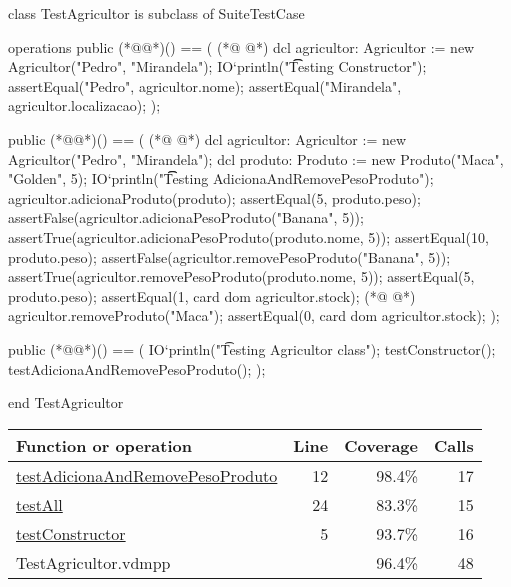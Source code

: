 \begin{vdmpp}[breaklines=true]
class TestAgricultor is subclass of SuiteTestCase
 
operations
  public (*@@*)() == (
(*@
\label{testConstructor:5}
@*)
   dcl agricultor: Agricultor := new Agricultor("Pedro", "Mirandela");
    IO`println("\t\t Testing Constructor");
    assertEqual("Pedro", agricultor.nome);
    assertEqual("Mirandela", agricultor.localizacao);
  );
  
 public (*@@*)() == (
(*@
\label{testAdicionaAndRemovePesoProduto:12}
@*)
  dcl agricultor: Agricultor := new Agricultor("Pedro", "Mirandela");
   dcl produto: Produto := new Produto("Maca", "Golden", 5);
  IO`println("\t\t Testing AdicionaAndRemovePesoProduto");
  agricultor.adicionaProduto(produto);
  assertEqual(5, produto.peso);  
  assertFalse(agricultor.adicionaPesoProduto("Banana", 5));
  assertTrue(agricultor.adicionaPesoProduto(produto.nome, 5));
  assertEqual(10, produto.peso);  
  assertFalse(agricultor.removePesoProduto("Banana", 5));
  assertTrue(agricultor.removePesoProduto(produto.nome, 5));
  assertEqual(5, produto.peso);
  assertEqual(1, card dom agricultor.stock);
(*@
\label{testAll:24}
@*)
  agricultor.removeProduto("Maca"); 
  assertEqual(0, card dom agricultor.stock);
  );
   
  public (*@@*)() == (
    IO`println("\t Testing Agricultor class");
    testConstructor();
    testAdicionaAndRemovePesoProduto();
  );

end TestAgricultor
\end{vdmpp}
\bigskip
\begin{longtable}{|l|r|r|r|}
\hline
Function or operation & Line & Coverage & Calls \\
\hline
\hline
\hyperref[testAdicionaAndRemovePesoProduto:12]{testAdicionaAndRemovePesoProduto} & 12&98.4\% & 17 \\
\hline
\hyperref[testAll:24]{testAll} & 24&83.3\% & 15 \\
\hline
\hyperref[testConstructor:5]{testConstructor} & 5&93.7\% & 16 \\
\hline
\hline
TestAgricultor.vdmpp & & 96.4\% & 48 \\
\hline
\end{longtable}

